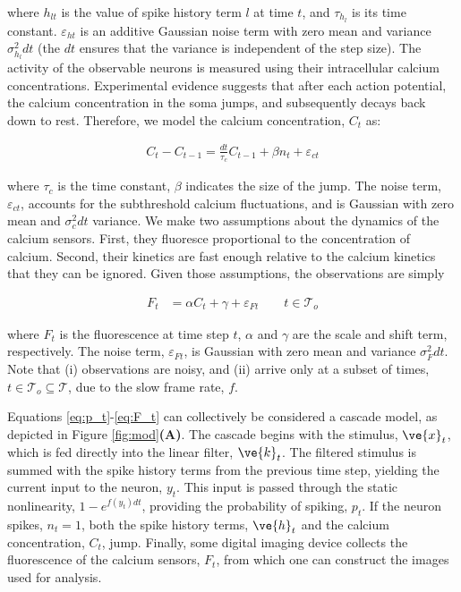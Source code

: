 \noindent where $h_{lt}$ is the value of spike history term $l$ at time $t$, and $\tau_{h_l}$ is its time constant.  $\varepsilon_{ht}$ is an additive Gaussian noise term with zero mean and variance $\sigma_{h_l}^2 dt$ (the $dt$ ensures that the variance is independent of the step size).  The activity of the observable neurons is measured using their intracellular calcium concentrations.  Experimental evidence suggests that after each action potential, the calcium concentration in the soma jumps, and subsequently decays back down to rest\cite{SmettersYuste99}.  Therefore, we model the calcium concentration, $C_t$ as:

\begin{align} \label{eq:C_t}
C_t - C_{t-1} = \frac{dt}{\tau_c} C_{t-1}   + \beta n_t + \varepsilon_{ct}%
\end{align}

\noindent where $\tau_c$ is the time constant, $\beta$ indicates the size of the jump. The noise term, $\varepsilon_{ct}$, accounts for the subthreshold calcium fluctuations, and is Gaussian with zero mean and $\sigma_c^2 dt$ variance.  We make two assumptions about the dynamics of the calcium sensors.  First, they fluoresce proportional to the concentration of calcium.  Second, their kinetics are fast enough relative to the calcium kinetics that they can be ignored.  Given those assumptions, the observations are simply

\begin{align} \label{eq:F_t}
F_t &= \alpha C_t + \gamma + \varepsilon_{Ft}%
\qquad t \in\mathcal{T}_o
\end{align}

\noindent where $F_t$ is the fluorescence at time step $t$, $\alpha$ and $\gamma$ are the scale and shift term, respectively.  The noise term, $\varepsilon_{Ft}$, is Gaussian with zero mean and variance $\sigma_F^2  dt$. Note that (i) observations are noisy, and (ii) arrive only at a subset of times, $t \in\mathcal{T}_o \subseteq \mathcal{T}$, due to the slow frame rate, $f$.

Equations \eqref{eq:p_t}-\eqref{eq:F_t} can collectively be considered a cascade model, as depicted in Figure \ref{fig:mod}\textbf{(A)}. The cascade begins with the stimulus, $\ve{x}_t$, which is fed directly into the linear filter, $\ve{k}_t$.  The filtered stimulus is summed with the spike history terms from the previous time step, yielding the current input to the neuron, $y_t$.  This input is passed through the static nonlinearity, $1-e^{f(y_t) dt}$, providing the probability of spiking, $p_t$.  If the neuron spikes, $n_t=1$, both the spike history terms, $\ve{h}_t$ and the calcium concentration, $C_t$, jump.  Finally, some digital imaging device collects the fluorescence of the calcium sensors, $F_t$, from which one can construct the images used for analysis.

